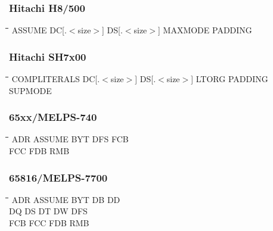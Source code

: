 \subsubsection{Hitachi H8/500}
{\tt\begin{tabbing}
\hspace{3cm}\=\hspace{3cm}\=\hspace{3cm}\=\hspace{3cm}\=\kill
ASSUME     \> DC[.$<$size$>$] \> DS[.$<$size$>$] \> MAXMODE     \> PADDING \\
\end{tabbing}}

\subsubsection{Hitachi SH7x00}
{\tt\begin{tabbing}
\hspace{3cm}\=\hspace{3cm}\=\hspace{3cm}\=\hspace{3cm}\=\kill
COMPLITERALS \> DC[.$<$size$>$]  \>  DS[.$<$size$>$]  \>  LTORG    \> PADDING \\
SUPMODE \\
\end{tabbing}}

\subsubsection{65xx/MELPS-740}
{\tt\begin{tabbing}
\hspace{3cm}\=\hspace{3cm}\=\hspace{3cm}\=\hspace{3cm}\=\kill
ADR        \> ASSUME      \> BYT         \> DFS         \> FCB \\
FCC        \> FDB         \> RMB \\
\end{tabbing}}

\subsubsection{65816/MELPS-7700}
{\tt\begin{tabbing}
\hspace{3cm}\=\hspace{3cm}\=\hspace{3cm}\=\hspace{3cm}\=\kill
ADR        \> ASSUME      \> BYT         \> DB          \> DD \\
DQ         \> DS          \> DT          \> DW          \> DFS \\
FCB        \> FCC         \> FDB         \> RMB \\
\end{tabbing}}

